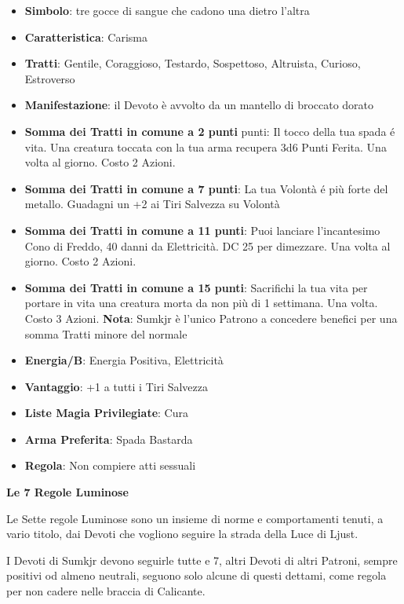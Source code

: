 \begin{multicols}{2}
\begin{itemize}[leftmargin=*] \setlength{\itemsep}{0pt}
\item \textbf{Simbolo}: tre gocce di sangue che cadono una dietro l'altra
\item \textbf{Caratteristica}: Carisma
\item \textbf{Tratti}: Gentile, Coraggioso, Testardo, Sospettoso, Altruista, Curioso, Estroverso
\item \textbf{Manifestazione}: il Devoto è avvolto da un mantello di broccato dorato
\item \textbf{Somma dei Tratti in comune a 2 punti} punti: Il tocco della tua spada é vita. Una creatura toccata con la tua arma recupera 3d6 Punti Ferita. Una volta al giorno. Costo 2 Azioni.
\item \textbf{Somma dei Tratti in comune a 7 punti}: La tua Volontà é più forte del metallo. Guadagni un +2 ai Tiri Salvezza su Volontà
\item \textbf{Somma dei Tratti in comune a 11 punti}: Puoi lanciare l'incantesimo Cono di Freddo, 40 danni da Elettricità. DC 25 per dimezzare. Una volta al giorno. Costo 2 Azioni.
\item \textbf{Somma dei Tratti in comune a 15 punti}: Sacrifichi la tua vita per portare in vita una creatura morta da non più di 1 settimana. Una volta. Costo 3 Azioni.
\textbf{Nota}: Sumkjr è l'unico Patrono a concedere benefici per una somma Tratti minore del normale
\item \textbf{Energia/B}: Energia Positiva, Elettricità
\item \textbf{Vantaggio}: +1 a tutti i Tiri Salvezza
\item \textbf{Liste Magia Privilegiate}: Cura
\item \textbf{Arma Preferita}: Spada Bastarda
\item \textbf{Regola}: Non compiere atti sessuali
\end{itemize}

\textbf{Le 7 Regole Luminose}

Le Sette regole Luminose sono un insieme di norme e comportamenti tenuti, a vario titolo, dai Devoti che vogliono seguire la strada della Luce di Ljust.

I Devoti di Sumkjr devono seguirle tutte e 7, altri Devoti di altri Patroni, sempre positivi od almeno neutrali, seguono solo alcune di questi dettami, come regola per non cadere nelle braccia di Calicante.


\end{multicols}
